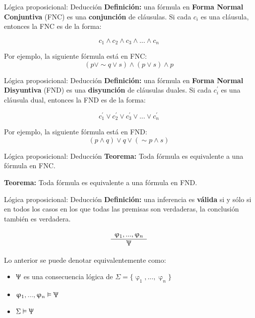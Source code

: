 \documentclass{beamer}
\begin{document}
\begin{frame}{Lógica proposicional: Deducción}
  \textbf{Definición:} una fórmula en \textbf{Forma Normal Conjuntiva} (FNC) es
  una \textbf{conjunción} de cláusulas. Si cada $c_{i}$ es una cláusula,
  entonces la FNC es de la forma:

  $$c_{1} \land c_{2} \land c_{3} \land ... \land c_{n}$$

  Por ejemplo, la siguiente fórmula está en FNC:
  $$(p \vee \sim q \vee s) \land (p \vee s) \land p$$
\end{frame}


\begin{frame}{Lógica proposicional: Deducción}
  \textbf{Definición:} una fórmula en \textbf{Forma Normal Disyuntiva} (FND) es
  una \textbf{disyunción} de cláusulas duales. Si cada $c^{'}_{i}$ es una
  cláusula dual, entonces la FND es de la forma:

  $$c^{'}_{1} \vee c^{'}_{2} \vee c^{'}_{3} \vee ... \vee c^{'}_{n}$$

  Por ejemplo, la siguiente fórmula está en FND:
  $$(p \land q) \vee q \vee (\sim p \land s)$$
\end{frame}


\begin{frame}{Lógica proposicional: Deducción}
  \textbf{Teorema:} Toda fórmula es equivalente a una fórmula en FNC.

  \vspace{1cm}

  \textbf{Teorema:} Toda fórmula es equivalente a una fórmula en FND.
\end{frame}


\begin{frame}{Lógica proposicional: Deducción}
  \textbf{Definición:} una inferencia es \textbf{válida} si y sólo si en todos
  los casos en los que todas las premisas son verdaderas, la conclusión también
  es verdadera.

  \[
    \begin{array}{c}
      \upvarphi_{1}, ..., \upvarphi_{n}\\
      \hline
      \Uppsi
    \end{array}
  \]

  Lo anterior se puede denotar equivalentemente como:
  \begin{itemize}
    \item $\Uppsi$ es una consecuencia lógica de
          $\Sigma = \{\upvarphi_{1}, ..., \upvarphi_{n}\}$
    \item $\upvarphi_{1}, ..., \upvarphi_{n} \vDash \Uppsi$
    \item $\Sigma \vDash \Uppsi$
  \end{itemize}
\end{frame}
\end{document}
